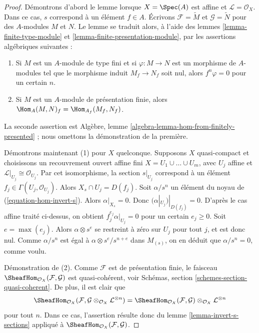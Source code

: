 \begin{proof}
Démontrons d'abord le lemme lorsque $X = \Spec(A)$ est affine
et $\mathcal{L} = \mathcal{O}_X$. Dans ce cas, $s$ correspond
à un élément $f \in A$. Écrivons
$\mathcal{F} = \widetilde{M}$ et $\mathcal{G} = \widetilde{N}$
pour des $A$-modules $M$ et $N$. Le lemme se traduit alors,
à l'aide des lemmes \ref{lemma-finite-type-module} et
\ref{lemma-finite-presentation-module}, par
les assertions algébriques suivantes :
\begin{enumerate}
\item Si $M$ est un $A$-module de type fini et si $\varphi : M \to N$ est
un morphisme de $A$-modules tel que le morphisme induit $M_f \to N_f$ soit nul,
alors $f^n\varphi = 0$ pour un certain $n$.
\item Si $M$ est un $A$-module de présentation finie, alors
$\Hom_A(M, N)_f = \Hom_{A_f}(M_f, N_f)$.
\end{enumerate}
La seconde assertion est
Algèbre, lemme \ref{algebra-lemma-hom-from-finitely-presented} ; nous omettons
la démonstration de la première.

\medskip\noindent
Démontrons maintenant (1) pour $X$ quelconque.
Supposons $X$ quasi-compact et choisissons un recouvrement ouvert affine fini
$X = U_1 \cup \ldots \cup U_m$, avec $U_j$ affine et
$\mathcal{L}|_{U_j} \cong \mathcal{O}_{U_j}$. Par cet isomorphisme,
la section $s|_{U_j}$ correspond à un élément
$f_j \in \Gamma(U_j, \mathcal{O}_{U_j})$. Alors
$X_s \cap U_j = D(f_j)$.
Soit $\alpha/s^n$ un élément du noyau de
(\ref{equation-hom-invert-s}). Alors $\alpha|_{X_s} = 0$.
Donc $(\alpha|_{U_j})|_{D(f_j)} = 0$. D'après le cas affine traité ci-dessus,
on obtient $f_j^{e_j} \alpha|_{U_j} = 0$ pour un certain
$e_j \geq 0$. Soit $e = \max(e_j)$. Alors $\alpha \otimes s^e$
se restreint à zéro sur $U_j$ pour tout $j$, et est donc nul. Comme $\alpha/s^n$
est égal à $\alpha \otimes s^e/s^{n + e}$ dans $M_{(s)}$, on en déduit
que $\alpha/s^n = 0$, comme voulu.

\medskip\noindent
Démonstration de (2). Comme $\mathcal{F}$ est de présentation finie, le
faisceau $\SheafHom_{\mathcal{O}_X}(\mathcal{F}, \mathcal{G})$ est
quasi-cohérent, voir Schémas, section \ref{schemes-section-quasi-coherent}.
De plus, il est clair que
$$
\SheafHom_{\mathcal{O}_X}(\mathcal{F},
\mathcal{G} \otimes_{\mathcal{O}_X} \mathcal{L}^{\otimes n}) =
\SheafHom_{\mathcal{O}_X}(\mathcal{F}, \mathcal{G})
\otimes_{\mathcal{O}_X} \mathcal{L}^{\otimes n}
$$
pour tout $n$. Dans ce cas, l'assertion résulte donc du
lemme \ref{lemma-invert-s-sections} appliqué à
$\SheafHom_{\mathcal{O}_X}(\mathcal{F}, \mathcal{G})$.
\end{proof}

